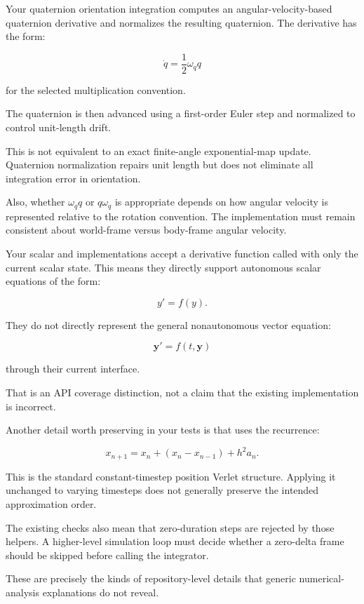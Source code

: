 Your quaternion orientation integration computes an angular-velocity-based quaternion derivative and normalizes the resulting quaternion. The derivative has the form:

\[
\dot q=\frac12\omega_q q
\]

for the selected multiplication convention.

The quaternion is then advanced using a first-order Euler step and normalized to control unit-length drift.

This is not equivalent to an exact finite-angle exponential-map update. Quaternion normalization repairs unit length but does not eliminate all integration error in orientation.

Also, whether \(\omega_q q\) or \(q\omega_q\) is appropriate depends on how angular velocity is represented relative to the rotation convention. The implementation must remain consistent about world-frame versus body-frame angular velocity.

Your scalar  and  implementations accept a derivative function called with only the current scalar state. This means they directly support autonomous scalar equations of the form:

\[
y'=f(y).
\]

They do not directly represent the general nonautonomous vector equation:

\[
\mathbf y'=f(t,\mathbf y)
\]

through their current interface.

That is an API coverage distinction, not a claim that the existing implementation is incorrect.

Another detail worth preserving in your tests is that  uses the recurrence:

\[
x_{n+1}=x_n+(x_n-x_{n-1})+h^2a_n.
\]

This is the standard constant-timestep position Verlet structure. Applying it unchanged to varying timesteps does not generally preserve the intended approximation order.

The existing  checks also mean that zero-duration steps are rejected by those helpers. A higher-level simulation loop must decide whether a zero-delta frame should be skipped before calling the integrator.

These are precisely the kinds of repository-level details that generic numerical-analysis explanations do not reveal.

